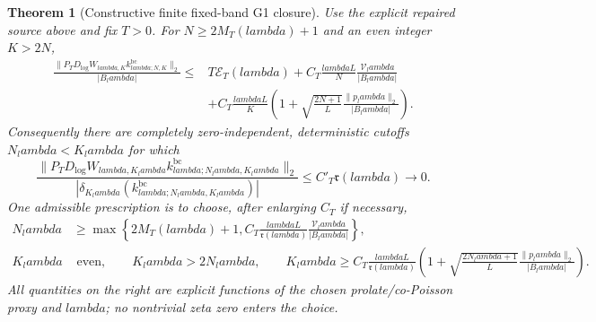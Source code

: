 \documentclass[11pt]{article}
\def\lambda{lambda}%
\newtheorem{theorem}{Theorem}[section]
\theoremstyle{remark}
\begin{document}
\begin{theorem}[Constructive finite fixed-band G1 closure]\label{thm:g1-boundary-corrected}
Use the explicit repaired source above and fix $T>0$. For $N\ge2M_T(\lambda)+1$ and an even integer
$K>2N$,
\begin{equation}\label{eq:g1-bc-master}
 \boxed{
 \begin{aligned}
 \frac{\|P_TD_{\log}W_{\lambda,K}
 k^{\mathrm{bc}}_{\lambda;N,K}\|_2}{|B_\lambda|}
 \le{}&T\mathcal E_T(\lambda)
 +C_T\frac{\lambda L}{N}
       \frac{\mathcal V_\lambda}{|B_\lambda|}\\
 &+C_T\frac{\lambda L}{K}
 \left(
 1+\sqrt{\frac{2N+1}{L}}
       \frac{\|p_\lambda\|_2}{|B_\lambda|}
 \right).
 \end{aligned}}
\end{equation}
Consequently there are completely zero-independent, deterministic cutoffs
$N_\lambda<K_\lambda$ for which
\begin{equation}\label{eq:g1-bc-vanishing}
 \boxed{
 \frac{\|P_TD_{\log}W_{\lambda,K_\lambda}
 k^{\mathrm{bc}}_{\lambda;N_\lambda,K_\lambda}\|_2}
 {|\delta_{K_\lambda}(k^{\mathrm{bc}}_{\lambda;N_\lambda,K_\lambda})|}
 \le C'_T\mathfrak r(\lambda)\longrightarrow0.}
\end{equation}
One admissible prescription is to choose, after enlarging $C_T$ if necessary,
\begin{align}
 N_\lambda&\ge
 \max\left\{2M_T(\lambda)+1,
 C_T\frac{\lambda L}{\mathfrak r(\lambda)}
       \frac{\mathcal V_\lambda}{|B_\lambda|}\right\},
 \label{eq:g1-N-explicit}\\
 K_\lambda&\text{ even},\qquad K_\lambda>2N_\lambda,\qquad
 K_\lambda\ge
 C_T\frac{\lambda L}{\mathfrak r(\lambda)}
 \left(1+\sqrt{\frac{2N_\lambda+1}{L}}
       \frac{\|p_\lambda\|_2}{|B_\lambda|}\right).
 \label{eq:g1-K-explicit}
\end{align}
All quantities on the right are explicit functions of the chosen
prolate/co-Poisson proxy and $\lambda$; no nontrivial zeta zero enters the
choice.
\end{theorem}
\end{document}
